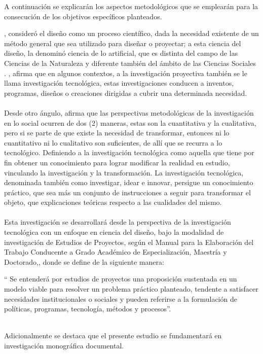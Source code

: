A continuación se explicarán los aspectos metodológicos que se emplearán para la consecución de los objetivos específicos planteados. 

\citet{simon1996sciences}, consideró el diseño como un proceso científico, dada la necesidad existente de un método general que sea utilizado para diseñar o proyectar; a esta ciencia del diseño, la denominó ciencia de lo artificial, que es distinta del campo de las Ciencias de la Naturaleza y diferente también del ámbito de las Ciencias Sociales \cite[pp. 42-43]{gonzalez2007configuracion}. \citet[pp. 567-569]{hurtado2012metodologia}, afirma que en algunos contextos, a la investigación proyectiva también se le llama investigación tecnológica, estas  investigaciones conducen a inventos, programas, diseños o creaciones dirigidas a cubrir una determinada necesidad.
\\
\\ 
Desde otro ángulo, \citet{cordoba2005investigacion} afirma que las perspectivas metodológicas de la investigación en lo social ocurren de dos (2) maneras, estas son la cuantitativa y la cualitativa, pero si se parte de que existe la necesidad de transformar, entonces ni lo cuantitativo ni lo cualitativo son suficientes, de allí que se recurra a lo tecnológico. Definiendo a la investigación tecnológica como aquella que tiene por fin obtener un conocimiento para lograr modificar la realidad en estudio, vinculando la investigación y la transformación. La investigación tecnológica, denominada también como investigar, idear e innovar, persigue un conocimiento práctico, que sea más un conjunto de instrucciones a seguir para transformar el objeto, que explicaciones teóricas respecto a las cualidades del mismo. \\
\\
Esta investigación se desarrollará desde la perspectiva de la investigación tecnológica con un enfoque en ciencia del diseño, bajo la modalidad de investigación de Estudios de Proyectos, según el Manual para la Elaboración del Trabajo Conducente a Grado Académico de Especialización, Maestría y Doctorado,\citet[p. 63]{UCLAmanual2002}, donde se define de la siguiente manera:
\begin{citatextual}
`` Se entenderá por estudios de proyectos una proposición sustentada en un modelo viable para resolver un problema práctico planteado, tendente a satisfacer necesidades institucionales o sociales y pueden referirse a la formulación de políticas, programas, tecnología, métodos y procesos''.
\end{citatextual}
\\
Adicionalmente se destaca que el presente estudio se fundamentará en investigación monográfica documental.

